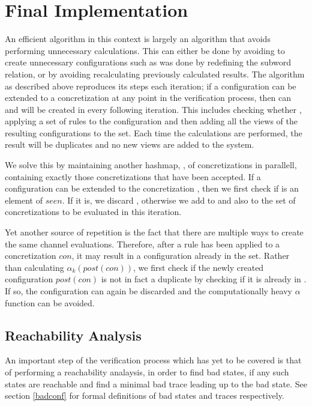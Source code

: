 \newpage
\section{Final Implementation}
An efficient algorithm in this context is largely an algorithm that avoids performing unnecessary calculations. This can either be done by avoiding to create unnecessary configurations such as was done by redefining the subword relation, or by avoiding recalculating previously calculated results. The algorithm as described above reproduces its steps each iteration; if a configuration  can be extended to a concretization  at any point in the verification process, then  can and will be created in every following iteration. This includes checking whether , applying a set of rules to the configuration and then adding all the views of the resulting configurations to the set. Each time the calculations are performed, the result will be duplicates and no new views are added to the system.

We solve this by maintaining another hashmap, , of concretizations in parallell, containing exactly those concretizations that have been accepted. If a configuration  can be extended to the concretization , then we first check if  is an element of $seen$. If it is, we discard , otherwise we add  to  and also to the set of concretizations to be evaluated in this iteration.

Yet another source of repetition is the fact that there are multiple ways to create the same channel evaluations. Therefore, after a rule has been applied to a concretization $con$, it may result in a configuration already in the set. Rather than calculating $\alpha_k(post(con))$, we first check if the newly created configuration $post(con)$ is not in fact a duplicate by checking if it is already in . If so, the configuration can again be discarded and the computationally heavy $\alpha$ function can be avoided.


\subsection{Reachability Analysis}
An important step of the verification process which has yet to be covered is that of performing a reachability analaysis, in order to find bad states, if any such states are reachable and find a minimal bad trace leading up to the bad state. See section \ref{badconf} for formal definitions of bad states and traces respectively.

